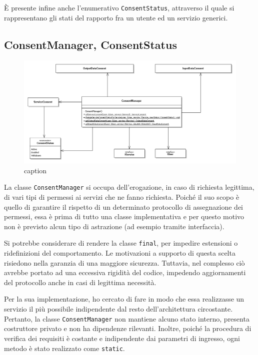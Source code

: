 \`E presente infine anche l’enumerativo \texttt{ConsentStatus}, attraverso il quale si rappresentano gli stati del rapporto fra un utente ed un servizio generici.


\subsection{ConsentManager, ConsentStatus}
\begin{figure} [h]
	\includegraphics[width=\linewidth]{pictures/Auth-CM.png}
	\caption{caption}
	\label{fig:Auth-CM}
\end{figure}
La classe \texttt{ConsentManager} si occupa dell’erogazione, in caso di richiesta legittima, di vari tipi di permessi ai servizi che ne fanno richiesta. Poich\'e il suo scopo \`e quello di garantire il rispetto di un determinato protocollo di assegnazione dei permessi, essa \`e prima di tutto una classe implementativa e per questo motivo non \`e previsto alcun tipo di astrazione (ad esempio tramite interfaccia).

Si potrebbe considerare di rendere la classe \texttt{final}, per impedire estensioni o ridefinizioni del comportamento. Le motivazioni a supporto di questa scelta risiedono nella garanzia di una maggiore sicurezza. Tuttavia, nel complesso ci\`o avrebbe portato ad una eccessiva rigidit\`a del codice, impedendo aggiornamenti del protocollo anche in casi di legittima necessit\`a.

Per la sua implementazione, ho cercato di fare in modo che essa realizzasse un servizio il pi\`u possibile indipendente dal resto dell’architettura circostante. Pertanto, la classe \texttt{ConsentManager} non mantiene alcuno stato interno, presenta costruttore privato e non ha dipendenze rilevanti. Inoltre, poich\'e la procedura di verifica dei requisiti \`e costante e indipendente dai parametri di ingresso, ogni metodo \`e stato realizzato come \texttt{static}. 

